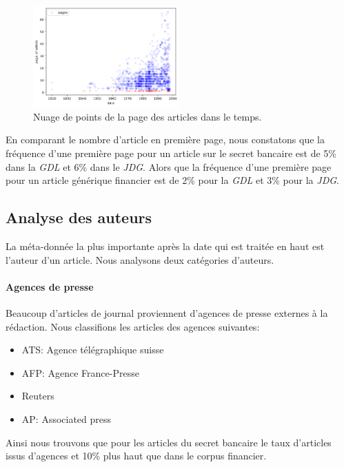 \documentclass[a4paper, 11pt]{article}
\begin{document}
\begin{figure}
\centering
\includegraphics[width=0.5\textwidth ]{methodology/scatter.png}
\caption{Nuage de points de la page des articles dans le temps.}
\end{figure}

En comparant le nombre d'article en première page, nous constatons que
la fréquence d'une première page pour un article sur le secret bancaire
est de 5\% dans la \emph{GDL} et 6\% dans le \emph{JDG}. Alors que la
fréquence d'une première page pour un article générique financier est de
2\% pour la \emph{GDL} et 3\% pour la \emph{JDG}.

\hypertarget{analyse-des-auteurs}{%
\subsection{Analyse des auteurs}\label{analyse-des-auteurs}}

La méta-donnée la plus importante après la date qui est traitée en haut
est l'auteur d'un article. Nous analysons deux catégories d'auteurs.

\hypertarget{agences-de-presse}{%
\paragraph{Agences de presse}\label{agences-de-presse}}

Beaucoup d'articles de journal proviennent d'agences de presse externes
à la rédaction. Nous classifions les articles des agences suivantes:

\begin{itemize}
\item
  ATS: Agence télégraphique suisse
\item
  AFP: Agence France-Presse
\item
  Reuters
\item
  AP: Associated press
\end{itemize}

Ainsi nous trouvons que pour les articles du secret bancaire le taux
d'articles issus d'agences et 10\% plus haut que dans le corpus
financier.
\end{document}
